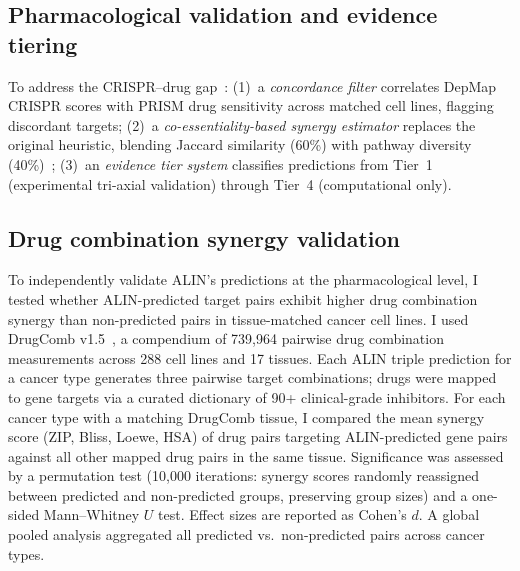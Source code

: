 \documentclass[11pt]{article}
\begin{document}
\subsection*{Pharmacological validation and evidence tiering}
To address the CRISPR--drug gap~\cite{Lin2017,Goncalves2020}: (1)~a \emph{concordance filter} correlates DepMap CRISPR scores with PRISM drug sensitivity across matched cell lines, flagging discordant targets; (2)~a \emph{co-essentiality-based synergy estimator} replaces the original heuristic, blending Jaccard similarity (60\%) with pathway diversity (40\%)~\cite{Norman2019,Shen2017combCRISPR}; (3)~an \emph{evidence tier system} classifies predictions from Tier~1 (experimental tri-axial validation) through Tier~4 (computational only).

\subsection*{Drug combination synergy validation}
To independently validate ALIN's predictions at the pharmacological level, I tested whether ALIN-predicted target pairs exhibit higher drug combination synergy than non-predicted pairs in tissue-matched cancer cell lines. I used DrugComb v1.5~\cite{Zagidullin2019,Zheng2022}, a compendium of 739{,}964 pairwise drug combination measurements across 288 cell lines and 17 tissues. Each ALIN triple prediction for a cancer type generates three pairwise target combinations; drugs were mapped to gene targets via a curated dictionary of 90+ clinical-grade inhibitors. For each cancer type with a matching DrugComb tissue, I compared the mean synergy score (ZIP, Bliss, Loewe, HSA) of drug pairs targeting ALIN-predicted gene pairs against all other mapped drug pairs in the same tissue. Significance was assessed by a permutation test (10{,}000 iterations: synergy scores randomly reassigned between predicted and non-predicted groups, preserving group sizes) and a one-sided Mann--Whitney $U$ test. Effect sizes are reported as Cohen's $d$. A global pooled analysis aggregated all predicted vs.\ non-predicted pairs across cancer types.
\end{document}
